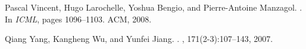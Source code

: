 \documentclass[11pt]{article}
\begin{document}
\begin{thebibliography}{}
Pascal Vincent, Hugo Larochelle, Yoshua Bengio, and Pierre-Antoine Manzagol.
.
\newblock In {\em {ICML}}, pages 1096--1103. ACM, 2008.

Qiang Yang, Kangheng Wu, and Yunfei Jiang.
.
, 171(2-3):107--143, 2007.

\end{thebibliography}

% 
% 
% 

\end{document}
